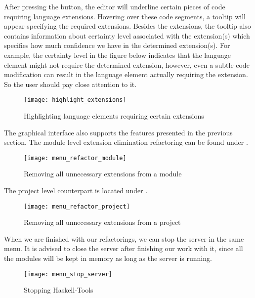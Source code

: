 \documentclass[main.tex]{subfiles}
\begin{document}
	After pressing the button, the editor will underline certain pieces of code requiring language extensions. Hovering over these code segments, a tooltip will appear specifying the required extensions. Besides the extensions, the tooltip also contains information about certainty level associated with the extension(s) which specifies how much confidence we have in the determined extension(s). For example, the  certainty level in the figure below indicates that the language element might not require the determined extension, however, even a subtle code modification can result in the language element actually requiring the extension. So the user should pay close attention to it.
	
	\begin{figure}[H]
		\hspace{-1cm}
		\centering
		\texttt{[image: highlight\_extensions]}
		\caption{Highlighting language elements requiring certain extensions}
		\label{fig:highlight_extensions}
	\end{figure}
	
	\newpage
	
	The graphical interface also supports the features presented in the previous section. The module level extension elimination refactoring can be found under .
	
	\begin{figure}[H]
		\hspace{-1cm}
		\centering
		\texttt{[image: menu\_refactor\_module]}
		\caption{Removing all unnecessary extensions from a module}
		\label{fig:menu_refactor_module}
	\end{figure}
	
	The project level counterpart is located under .
	
	\begin{figure}[H]
		\hspace{-1cm}
		\centering
		\texttt{[image: menu\_refactor\_project]}
		\caption{Removing all unnecessary extensions from a project}
		\label{fig:menu_refactor_project}
	\end{figure}
	
	When we are finished with our refactorings, we can stop the server in the same menu. It is advised to close the server after finishing our work with it, since all the modules will be kept in memory as long as the server is running.
	
	\begin{figure}[H]
		\hspace{-1cm}
		\centering
		\texttt{[image: menu\_stop\_server]}
		\caption{Stopping Haskell-Tools}
		\label{fig:menu_stop_server}
	\end{figure}
	
\end{document}
